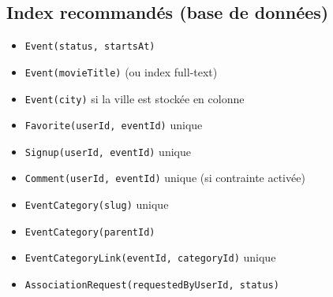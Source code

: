 \documentclass[11pt,a4paper]{article}
\begin{document}
\subsection{Index recommandés (base de données)}
\begin{itemize}
  \item \texttt{Event(status, startsAt)}
  \item \texttt{Event(movieTitle)} (ou index full-text)
  \item \texttt{Event(city)} si la ville est stockée en colonne
  \item \texttt{Favorite(userId, eventId)} unique
  \item \texttt{Signup(userId, eventId)} unique
  \item \texttt{Comment(userId, eventId)} unique (si contrainte activée)
  \item \texttt{EventCategory(slug)} unique
  \item \texttt{EventCategory(parentId)}
  \item \texttt{EventCategoryLink(eventId, categoryId)} unique
  \item \texttt{AssociationRequest(requestedByUserId, status)}
\end{itemize}
\end{document}
